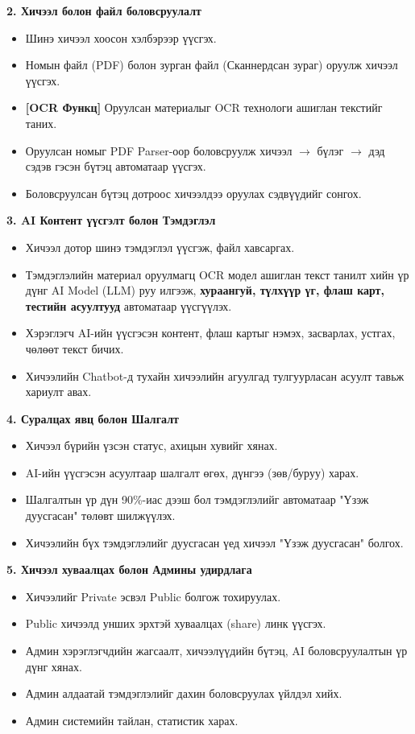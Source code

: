 \textbf{2. Хичээл болон файл боловсруулалт}
\begin{itemize}
    \item Шинэ хичээл хоосон хэлбэрээр үүсгэх.
    \item Номын файл (PDF) болон зурган файл (Сканнердсан зураг) оруулж хичээл үүсгэх.
    \item \textbf{[OCR Функц]} Оруулсан материалыг OCR технологи ашиглан текстийг таних.
    \item Оруулсан номыг PDF Parser-оор боловсруулж хичээл $\rightarrow$ бүлэг $\rightarrow$ дэд сэдэв гэсэн бүтэц автоматаар үүсгэх.
    \item Боловсруулсан бүтэц дотроос хичээлдээ оруулах сэдвүүдийг сонгох.
\end{itemize}

\textbf{3. AI Контент үүсгэлт болон Тэмдэглэл}
\begin{itemize}
    \item Хичээл дотор шинэ тэмдэглэл үүсгэж, файл хавсаргах.
    \item Тэмдэглэлийн материал оруулмагц OCR модел ашиглан текст танилт хийн үр дүнг AI Model (LLM) руу илгээж, \textbf{хураангуй, түлхүүр үг, флаш карт, тестийн асуултууд} автоматаар үүсгүүлэх.
    \item Хэрэглэгч AI-ийн үүсгэсэн контент, флаш картыг нэмэх, засварлах, устгах, чөлөөт текст бичих.
    \item Хичээлийн Chatbot-д тухайн хичээлийн агуулгад тулгуурласан асуулт тавьж хариулт авах.
\end{itemize}

\textbf{4. Суралцах явц болон Шалгалт}
\begin{itemize}
    \item Хичээл бүрийн үзсэн статус, ахицын хувийг хянах.
    \item AI-ийн үүсгэсэн асуултаар шалгалт өгөх, дүнгээ (зөв/буруу) харах.
    \item Шалгалтын үр дүн 90\%-иас дээш бол тэмдэглэлийг автоматаар "Үзэж дуусгасан" төлөвт шилжүүлэх.
    \item Хичээлийн бүх тэмдэглэлийг дуусгасан үед хичээл "Үзэж дуусгасан" болгох.
\end{itemize}

\textbf{5. Хичээл хуваалцах болон Админы удирдлага}
\begin{itemize}
    \item Хичээлийг Private эсвэл Public болгож тохируулах.
    \item Public хичээлд унших эрхтэй хуваалцах (share) линк үүсгэх.
    \item Админ хэрэглэгчдийн жагсаалт, хичээлүүдийн бүтэц, AI боловсруулалтын үр дүнг хянах.
    \item Админ алдаатай тэмдэглэлийг дахин боловсруулах үйлдэл хийх.
    \item Админ системийн тайлан, статистик харах.
\end{itemize}

